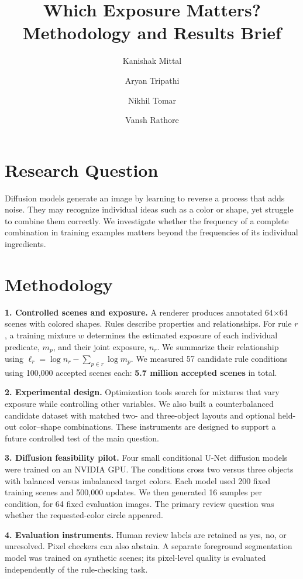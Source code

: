 \documentclass[10pt]{article}
\title{Which Exposure Matters?\\\large Methodology and Results Brief}
\author{Kanishak Mittal \and Aryan Tripathi \and Nikhil Tomar \and Vansh Rathore}
\date{}
\begin{document}
\maketitle\vspace{-1.2cm}
\section*{Research Question}
Diffusion models generate an image by learning to reverse a process that adds noise. They may recognize individual ideas such as a color or shape, yet struggle to combine them correctly. We investigate whether the frequency of a complete combination in training examples matters beyond the frequencies of its individual ingredients.

\section*{Methodology}
\textbf{1. Controlled scenes and exposure.} A renderer produces annotated 64$\times$64 scenes with colored shapes. Rules describe properties and relationships. For rule $r$, a training mixture $w$ determines the estimated exposure of each individual predicate, $m_p$, and their joint exposure, $n_r$. We summarize their relationship using $\ell_r=\log n_r-\sum_{p\in r}\log m_p$. We measured 57 candidate rule conditions using 100,000 accepted scenes each: \textbf{5.7 million accepted scenes} in total.

\textbf{2. Experimental design.} Optimization tools search for mixtures that vary exposure while controlling other variables. We also built a counterbalanced candidate dataset with matched two- and three-object layouts and optional held-out color--shape combinations. These instruments are designed to support a future controlled test of the main question.

\textbf{3. Diffusion feasibility pilot.} Four small conditional U-Net diffusion models were trained on an NVIDIA GPU. The conditions cross two versus three objects with balanced versus imbalanced target colors. Each model used 200 fixed training scenes and 500,000 updates. We then generated 16 samples per condition, for 64 fixed evaluation images. The primary review question was whether the requested-color circle appeared.

\textbf{4. Evaluation instruments.} Human review labels are retained as yes, no, or unresolved. Pixel checkers can also abstain. A separate foreground segmentation model was trained on synthetic scenes; its pixel-level quality is evaluated independently of the rule-checking task.
\end{document}
